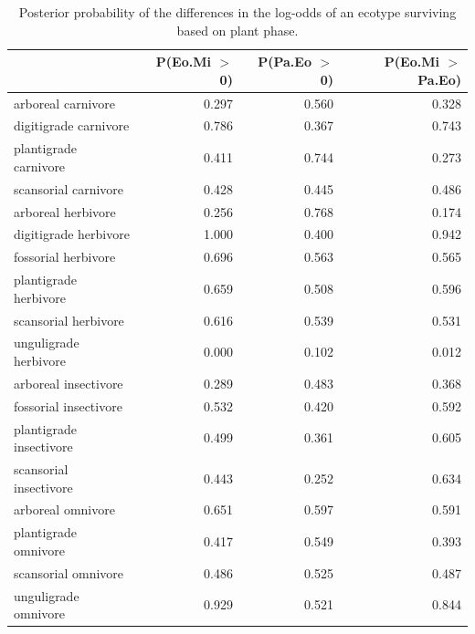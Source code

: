 \documentclass[12pt,letterpaper]{article}
\begin{document}
\begin{table}[ht]
  \centering
  \caption[Posterior probablity estimates of differences in survival by plant phase]{Posterior probability of the differences in the log-odds of an ecotype surviving based on plant phase.} 
  \label{tab:surv_plant}
  \begin{tabular}{ l r r r }
    \hline
    & P(Eo.Mi $>$ 0) & P(Pa.Eo $>$ 0) & P(Eo.Mi $>$ Pa.Eo) \\ 
    \hline
    arboreal carnivore & 0.297 & 0.560 & 0.328 \\ 
    digitigrade carnivore & 0.786 & 0.367 & 0.743 \\ 
    plantigrade carnivore & 0.411 & 0.744 & 0.273 \\ 
    scansorial carnivore & 0.428 & 0.445 & 0.486 \\ 
    arboreal herbivore & 0.256 & 0.768 & 0.174 \\ 
    digitigrade herbivore & 1.000 & 0.400 & 0.942 \\ 
    fossorial herbivore & 0.696 & 0.563 & 0.565 \\ 
    plantigrade herbivore & 0.659 & 0.508 & 0.596 \\ 
    scansorial herbivore & 0.616 & 0.539 & 0.531 \\ 
    unguligrade herbivore & 0.000 & 0.102 & 0.012 \\ 
    arboreal insectivore & 0.289 & 0.483 & 0.368 \\ 
    fossorial insectivore & 0.532 & 0.420 & 0.592 \\ 
    plantigrade insectivore & 0.499 & 0.361 & 0.605 \\ 
    scansorial insectivore & 0.443 & 0.252 & 0.634 \\ 
    arboreal omnivore & 0.651 & 0.597 & 0.591 \\ 
    plantigrade omnivore & 0.417 & 0.549 & 0.393 \\ 
    scansorial omnivore & 0.486 & 0.525 & 0.487 \\ 
    unguligrade omnivore & 0.929 & 0.521 & 0.844 \\ 
    \hline
  \end{tabular}
\end{table}
\end{document}
